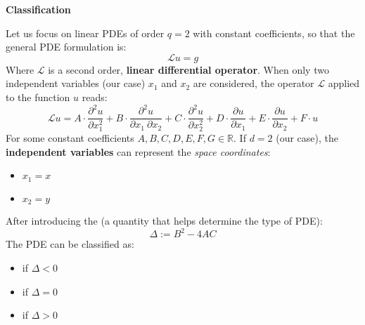 \highspace
\begin{flushleft}
    \textcolor{Green3}{ \textbf{Classification}}
\end{flushleft}
Let us focus on linear PDEs of order $q = 2$ with constant coefficients, so that the general PDE formulation is:
\begin{equation*}
    \mathcal{L}u = g
\end{equation*}
Where $\mathcal{L}$ is a second order, \textbf{linear differential operator}. When only two independent variables (our case) $x_{1}$ and $x_{2}$ are considered, the operator $\mathcal{L}$ applied to the function $u$ reads:
\begin{equation*}
    \mathcal{L}u = 
    A \cdot \dfrac{\partial^{2} u}{\partial x_{1}^{2}} +
    B \cdot \dfrac{\partial^{2} u}{\partial x_{1} \: \partial x_{2}} +
    C \cdot \dfrac{\partial^{2} u}{\partial x_{2}^{2}} +
    D \cdot \dfrac{\partial u}{\partial x_{1}} +
    E \cdot \dfrac{\partial u}{\partial x_{2}} +
    F \cdot u
\end{equation*}
For some constant coefficients $A, B, C, D, E, F, G \in \mathbb{R}$. If $d = 2$ (our case), the \textbf{independent variables} can represent the \emph{space coordinates}:
\begin{itemize}
    \item $x_{1} = x$
    \item $x_{2} = y$
\end{itemize}
After introducing the  (a quantity that helps determine the type of PDE):
\begin{equation}
   \Delta := B^{2} - 4AC 
\end{equation}
\newpage
\noindent
The PDE can be classified as:
\begin{itemize}
    \item {} if $\Delta < 0$
    \item {} if $\Delta = 0$
    \item {} if $\Delta > 0$
\end{itemize}

